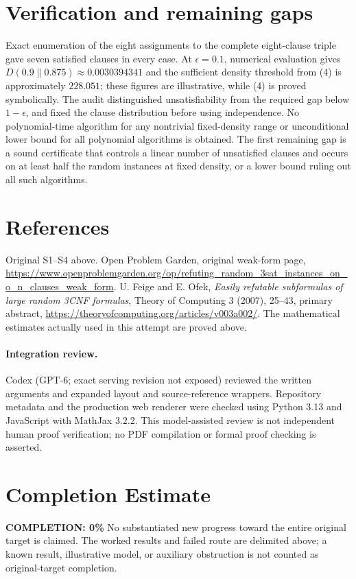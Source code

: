 \documentclass[11pt]{article}
\begin{document}
\section{Verification and remaining gaps}
Exact enumeration of the eight assignments to the complete eight-clause triple gave seven satisfied clauses in every case. At $\epsilon=0.1$, numerical evaluation gives $D(0.9\|0.875)\approx0.0030394341$ and the sufficient density threshold from (4) is approximately $228.051$; these figures are illustrative, while (4) is proved symbolically. The audit distinguished unsatisfiability from the required gap below $1-\epsilon$, and fixed the clause distribution before using independence. No polynomial-time algorithm for any nontrivial fixed-density range or unconditional lower bound for all polynomial algorithms is obtained. The first remaining gap is a sound certificate that controls a linear number of unsatisfied clauses and occurs on at least half the random instances at fixed density, or a lower bound ruling out all such algorithms.

\section{References}
Original S1--S4 above. Open Problem Garden, original weak-form page, \url{https://www.openproblemgarden.org/op/refuting_random_3sat_instances_on_o_n_clauses_weak_form}. U. Feige and E. Ofek, \emph{Easily refutable subformulas of large random 3CNF formulas}, Theory of Computing 3 (2007), 25--43, primary abstract, \url{https://theoryofcomputing.org/articles/v003a002/}. The mathematical estimates actually used in this attempt are proved above.


\paragraph{Integration review.} Codex (GPT-6; exact serving revision not exposed) reviewed the written arguments and expanded layout and source-reference wrappers. Repository metadata and the production web renderer were checked using Python 3.13 and JavaScript with MathJax 3.2.2. This model-assisted review is not independent human proof verification; no PDF compilation or formal proof checking is asserted.

\section{Completion Estimate}
\noindent\textbf{COMPLETION: 0\%}
No substantiated new progress toward the entire original target is claimed. The worked results and failed route are delimited above; a known result, illustrative model, or auxiliary obstruction is not counted as original-target completion.
\end{document}
